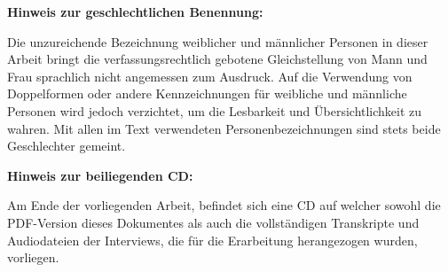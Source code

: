 \vspace*{\fill}


\begin{flushleft}
\textbf{Hinweis zur geschlechtlichen Benennung:}
\end{flushleft}
Die unzureichende Bezeichnung weiblicher und männlicher Personen in dieser Arbeit bringt die verfassungsrechtlich gebotene Gleichstellung von Mann und Frau sprachlich nicht angemessen zum Ausdruck. Auf die Verwendung von Doppelformen oder andere Kennzeichnungen für weibliche und männliche Personen wird jedoch verzichtet, um die Lesbarkeit und Übersichtlichkeit zu wahren. Mit allen im Text verwendeten Personenbezeichnungen sind stets beide Geschlechter gemeint.

\begin{flushleft}
\textbf{Hinweis zur beiliegenden CD:}
\end{flushleft}
Am Ende der vorliegenden Arbeit, befindet sich eine CD auf welcher sowohl die PDF-Version dieses Dokumentes als auch die vollständigen Transkripte und Audiodateien der Interviews, die für die Erarbeitung herangezogen wurden, vorliegen.